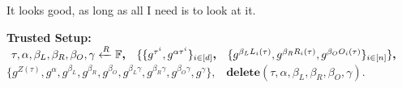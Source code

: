 \documentclass{zkdl-presentation-template}
\begin{document}
    \begin{frame}{It looks good, as long as all I need is to look at it.}
        \scriptsize

        \textbf{Trusted Setup: }
        $\tau, \alpha, \beta_L, \beta_R, \beta_O, \gamma \xleftarrow{R} \mathbb{F} \textbf{,} \quad \{ \{g^{\tau^i}, g^{\alpha \tau^i} \}_{i \in [d]}\textbf{,} \quad \{\textcolor{black!50!black}{g^{\beta_LL_i(\tau)}, g^{\beta_RR_i(\tau)}, g^{\beta_OO_i(\tau)}}\}_{i \in \left[ n \right]} \} \textbf{,}$
        $\{ g^{Z(\tau)}, g^{\alpha}, g^{\beta_L}, g^{\beta_R}, g^{\beta_O}, g^{\beta_L\gamma}, g^{\beta_R\gamma}, g^{\beta_O\gamma}, g^{\gamma}\}\textbf{,} \quad \textbf{delete}(\tau, \alpha, \beta_L, \beta_R, \beta_O, \gamma)$.
        \vspace{10pt}


        \begin{center}
\end{center}
\end{frame}
\end{document}
